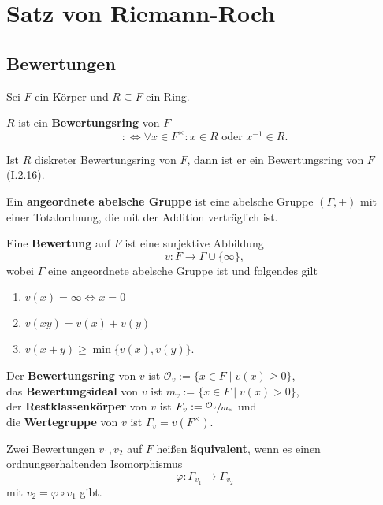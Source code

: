 
\chapter{Satz von Riemann-Roch}
\section{Bewertungen}
Sei $F$ ein Körper und $R \subseteq F$ ein Ring.

\begin{definition}
    $R$ ist ein \textbf{Bewertungsring} von $F$
    $$:\iff \forall x  \in F^{\times}: x \in R \text{ oder } x^{-1} \in R.$$
\end{definition}

\begin{beispiel}
    Ist $R$ diskreter Bewertungsring von $F$, dann ist er ein Bewertungsring von $F$ (I.2.16).
\end{beispiel}

\begin{definition}
    Ein \textbf{angeordnete abelsche Gruppe} ist eine abelsche Gruppe $(\Gamma, +)$ mit einer
    Totalordnung, die mit der Addition verträglich ist.

    Eine \textbf{Bewertung} auf $F$ ist eine surjektive Abbildung
    $$ v: F \to \Gamma \cup \{\infty\}, $$
    wobei $\Gamma$ eine angeordnete abelsche Gruppe ist und folgendes gilt
    \begin{enumerate}[label=(\arabic*)]
        \item $v(x) = \infty \iff x = 0$
        \item $v(xy) = v(x) + v(y)$
        \item $v(x+y) \geq \min\{v(x), v(y)\}$.
    \end{enumerate}

    Der \textbf{Bewertungsring} von $v$ ist $\mathcal{O}_v := \{x \in F \mid v(x) \geq 0\}$,\\
    das \textbf{Bewertungsideal} von $v$ ist $m_v := \{x \in F \mid v(x) > 0\}$,\\
    der \textbf{Restklassenkörper} von $v$ ist $F_v := \sfrac{\mathcal{O}_v}{m_v}$ und\\
    die \textbf{Wertegruppe} von $v$ ist $\Gamma_v = v(F^\times)$.

    Zwei Bewertungen $v_1, v_2$ auf $F$ heißen \textbf{äquivalent}, wenn es einen ordnungserhaltenden
    Isomorphismus
    $$ \varphi : \Gamma_{v_1} \to \Gamma_{v_2}$$ mit $v_2 = \varphi \circ v_1$ gibt.
\end{definition}

